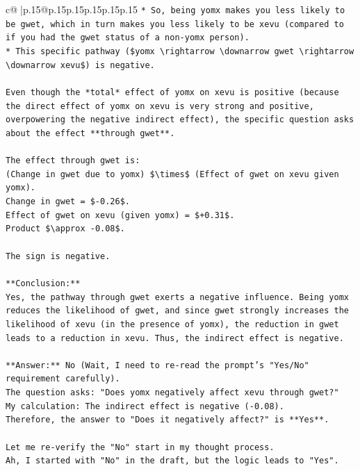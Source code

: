 \documentclass{article}
\begin{document}
{\begin{supertabular}{c@{$\;$}|p{.15\linewidth}@{}p{.15\linewidth}p{.15\linewidth}p{.15\linewidth}p{.15\linewidth}p{.15\linewidth}}
{{{\texttt{*   So, being yomx makes you less likely to be gwet, which in turn makes you less likely to be xevu (compared to if you had the gwet status of a non{-}yomx person).} \\
\texttt{*   This specific pathway (\$yomx \textbackslash{}rightarrow \textbackslash{}downarrow gwet \textbackslash{}rightarrow \textbackslash{}downarrow xevu\$) is negative.} \\
\\ 
\texttt{Even though the *total* effect of yomx on xevu is positive (because the direct effect of yomx on xevu is very strong and positive, overpowering the negative indirect effect), the specific question asks about the effect **through gwet**.} \\
\\ 
\texttt{The effect through gwet is:} \\
\texttt{(Change in gwet due to yomx) \$\textbackslash{}times\$ (Effect of gwet on xevu given yomx).} \\
\texttt{Change in gwet = \${-}0.26\$.} \\
\texttt{Effect of gwet on xevu (given yomx) = \$+0.31\$.} \\
\texttt{Product \$\textbackslash{}approx {-}0.08\$.} \\
\\ 
\texttt{The sign is negative.} \\
\\ 
\texttt{**Conclusion:**} \\
\texttt{Yes, the pathway through gwet exerts a negative influence. Being yomx reduces the likelihood of gwet, and since gwet strongly increases the likelihood of xevu (in the presence of yomx), the reduction in gwet leads to a reduction in xevu. Thus, the indirect effect is negative.} \\
\\ 
\texttt{**Answer:** No (Wait, I need to re{-}read the prompt's "Yes/No" requirement carefully).} \\
\texttt{The question asks: "Does yomx negatively affect xevu through gwet?"} \\
\texttt{My calculation: The indirect effect is negative ({-}0.08).} \\
\texttt{Therefore, the answer to "Does it negatively affect?" is **Yes**.} \\
\\ 
\texttt{Let me re{-}verify the "No" start in my thought process.} \\
\texttt{Ah, I started with "No" in the draft, but the logic leads to "Yes".} \\
}}}
\end{supertabular}}
\end{document}

